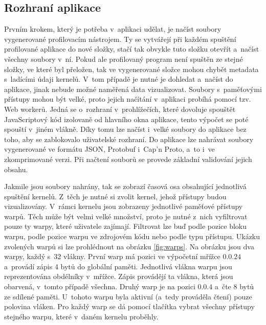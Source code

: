 \subsection{Rozhraní aplikace}
Prvním krokem, který je potřeba v~aplikaci udělat, je načíst soubory vygenerované profilovacím nástrojem. Ty se vytvářejí při každém spuštění profilované aplikace do nové složky, stačí tak obvykle tuto složku otevřít a~načíst všechny soubory v~ní. Pokud ale profilovaný program není spuštěn ze stejné složky, ve které byl přeložen, tak ve vygenerované složce mohou chybět metadata s~ladícími údaji kernelů. V~tom případě je nutné je dohledat a~načíst do aplikace, jinak \mbox{nebude} možné naměřená data vizualizovat. Soubory s~paměťovými přístupy mohou být velké, proto jejich načítání v~aplikaci probíhá pomocí tzv. Web workerů. Jedná se o~rozhraní v~prohlížečích, které dovoluje spouštět JavaScriptový kód izolovaně od hlavního okna aplikace, tento výpočet se poté spouští v~jiném vlákně. Díky tomu lze načíst i~velké soubory do aplikace bez toho, aby se zablokovalo uživatelské rozhraní. Do aplikace lze nahrávat soubory vygenerované ve formátu JSON, Protobuf i~Cap'n Proto, a~to i~ve zkomprimované verzi. Při načtení souborů se provede základní validování jejich obsahu.

Jakmile jsou soubory nahrány, tak se zobrazí časová osa obsahující jednotlivá spuštění \mbox{kernelů}. Z~těch je nutné si zvolit kernel, jehož přístupy budou vizualizovány. V~rámci kernelu jsou zobrazeny jednotlivé paměťové přístupy warpů. Těch může být velmi velké množství, proto je nutné z~nich vyfiltrovat pouze ty warpy, které uživatele zajímají. Filtrovat lze buď podle pozice bloku warpu, podle pozice warpu ve zdrojovém kódu nebo podle typu přístupu. Ukázku zvolených warpů si lze prohlédnout na obrázku \ref{fig:warps}.
Na obrázku jsou dva warpy, každý s~32 vlákny. První warp má pozici ve výpočetní mřížce $0.0.24$ a~provádí zápis 4 bytů do globální paměti. Jednotlivá vlákna warpu jsou reprezentována obdélníky v~mřížce. Zápis provádějí ta vlákna, která jsou obarvená, v~tomto případě všechna. Druhý warp je na pozici $0.0.4$ a~čte 8 bytů ze sdílené paměti. U~tohoto warpu byla aktivní (a~tedy prováděla čtení) pouze polovina vláken. Pro každý warp se dá pomocí tlačítka vybrat všechny přístupy stejného warpu, které v~daném kernelu proběhly.


